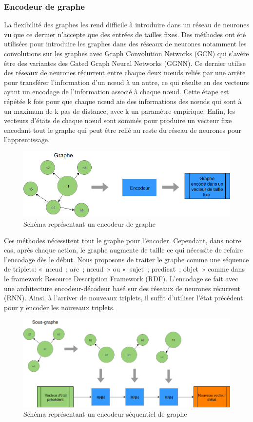 \subsubsection*{Encodeur de graphe}
La flexibilité des graphes les rend difficile à introduire dans un réseau de neurones vu que ce dernier n'accepte que des entrées de tailles fixes. Des méthodes ont été utilisées pour introduire les graphes dans des réseaux de neurones notamment les convolutions sur les graphes avec Graph Convolution Networks (GCN)\cite{KipfW17} qui s'avère être des variantes des Gated Graph Neural Networks (GGNN)\cite{Li2016GatedGS}. Ce dernier utilise des réseaux de neurones récurrent entre chaque deux nœuds reliés par une arrête pour transférer l'information d'un nœud à un autre, ce qui résulte en des vecteurs ayant un encodage de l'information associé à chaque nœud. Cette étape est répétée k fois pour que chaque nœud aie des informations des nœuds qui sont à un maximum de k pas de distance, avec k un paramètre empirique. Enfin, les vecteurs d'états de chaque nœud sont sommés pour produire un vecteur fixe encodant tout le graphe qui peut être relié au reste du réseau de neurones pour l'apprentissage.
\begin{figure}[H] 
	\centering
	\includegraphics[width=0.8\linewidth]{images/Conception/DM/encoder.png}
	\caption{Schéma représentant un encodeur de graphe}
	
\end{figure}\label{encoder}
Ces méthodes nécessitent tout le graphe pour l'encoder. Cependant, dans notre cas, après chaque action, le graphe augmente de taille ce qui nécessite de refaire l'encodage dès le début. Nous proposons de traiter le graphe comme une séquence de triplets: « nœud ; arc ; nœud » ou « sujet ; predicat ; objet » comme dans le framework Resource Description Framework (RDF). L'encodage se fait avec une architecture encodeur-décodeur basé sur des réseaux de neurones récurrent (RNN). Ainsi, à l'arriver de nouveaux triplets, il suffit d'utiliser l'état précédent pour y encoder les nouveaux triplets.
\begin{figure}[H] 
	\centering
	\includegraphics[width=0.8\linewidth]{images/Conception/DM/encoder_seq.png}
	\caption{Schéma représentant un encodeur séquentiel de graphe}
	
\end{figure}\label{encoder_seq}
